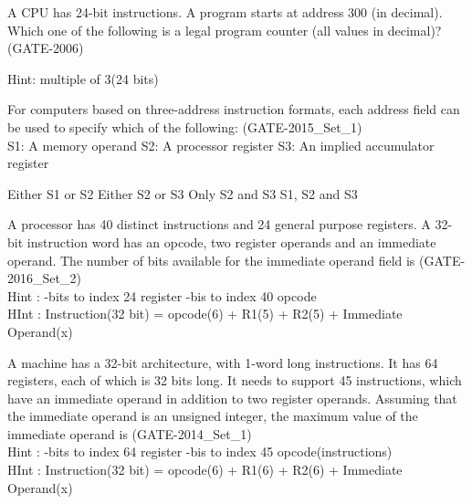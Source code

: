 \begin{questyle}
  \question  A CPU has 24-bit instructions. A program starts at address 300 (in decimal). Which one
             of the following is a legal program counter (all values in decimal)?  (GATE-2006)

  \begin{oneparchoices}
          \qquad Hint: multiple of 3(24 bits)
  \end{oneparchoices}
\end{questyle}

\begin{questyle}
  \question  For computers based on three-address instruction formats, each address field can be used
             to specify which of the following:  (GATE-2015\_Set\_1) \\
             S1: A memory operand \quad S2: A processor register \quad S3: An implied accumulator register

  \begin{oneparchoices}
    \CorrectChoice  Either S1 or S2
    \choice         Either S2 or S3
    \choice         Only S2 and S3
    \choice         S1, S2 and S3
  \end{oneparchoices}
\end{questyle}


\begin{questyle}
  \question  A processor has 40 distinct instructions and 24 general purpose registers.
             A 32-bit instruction word has an opcode, two register operands and an immediate operand.
             The number of bits available for the immediate operand field is \fillin[16] (GATE-2016\_Set\_2)
             \\ Hint : -bits to index 24 register -bis to index 40 opcode
             \\ HInt : \qquad Instruction(32 bit) = opcode(6) + R1(5) + R2(5) + Immediate Operand(x)
\end{questyle}

\begin{questyle}
  \question  A machine has a 32-bit architecture, with 1-word long instructions. It has 64 registers,
             each of which is 32 bits long. It needs to support 45 instructions, which have an immediate
             operand in addition to two register operands. Assuming that the immediate operand is an
             unsigned integer, the maximum value of the immediate operand is
             \fillin[16383 \( \boldsymbol {(2^{14} -1)} \)] (GATE-2014\_Set\_1)
             \\ Hint : -bits to index 64 register -bis to index 45 opcode(instructions)
             \\ HInt : \qquad Instruction(32 bit) = opcode(6) + R1(6) + R2(6) + Immediate Operand(x)
\end{questyle}

